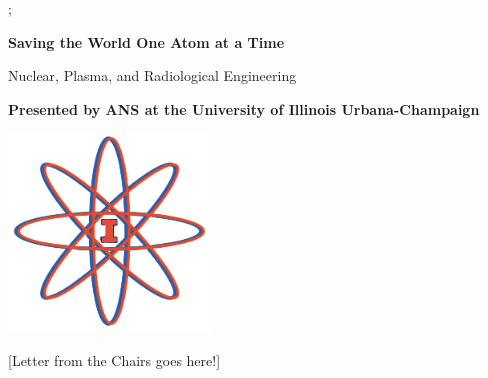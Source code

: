 \documentclass[12pt, letterpaper]{article}
\begin{document}
\begin{titlepage}
;


   \begin{center}

       \vspace*{1cm}
 
       \Huge\color{white}\textbf{Saving the World One Atom at a Time}
 
       \vspace{0.5cm}
       Nuclear, Plasma, and Radiological Engineering
 
       \vspace{1.5cm}
 
       \Large\textbf{Presented by ANS at the University of Illinois Urbana-Champaign}
 
       \vfill
       \vspace{0.8cm}
 
       \includegraphics[width=0.4\textwidth]{ans_sc_logo3.png}
   \end{center}
\end{titlepage}

\clearpage
\newpage

[Letter from the Chairs goes here!]

\newpage
\tableofcontents
\newpage


\end{document}
